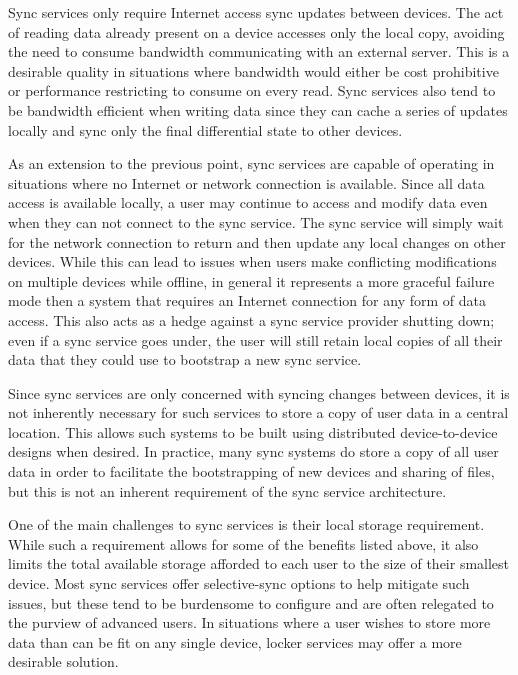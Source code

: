 \begin{packed_desc}
\item[Bandwidth Efficient:] Sync services only require Internet access
  sync updates between devices. The act of reading data already
  present on a device accesses only the local copy, avoiding the need
  to consume bandwidth communicating with an external server. This is
  a desirable quality in situations where bandwidth would either be
  cost prohibitive or performance restricting to consume on every
  read. Sync services also tend to be bandwidth efficient when writing
  data since they can cache a series of updates locally and sync only
  the final differential state to other devices.
\item[Offline Support:] As an extension to the previous point, sync
  services are capable of operating in situations where no Internet or
  network connection is available. Since all data access is available
  locally, a user may continue to access and modify data even when
  they can not connect to the sync service. The sync service will
  simply wait for the network connection to return and then update any
  local changes on other devices. While this can lead to issues when
  users make conflicting modifications on multiple devices while
  offline, in general it represents a more graceful failure mode then
  a system that requires an Internet connection for any form of data
  access. This also acts as a hedge against a sync service provider
  shutting down; even if a sync service goes under, the user will
  still retain local copies of all their data that they could use to
  bootstrap a new sync service.
\item[No Central Storage:] Since sync services are only concerned with
  syncing changes between devices, it is not inherently necessary for
  such services to store a copy of user data in a central
  location. This allows such systems to be built using distributed
  device-to-device designs when desired. In practice, many sync
  systems do store a copy of all user data in order to facilitate the
  bootstrapping of new devices and sharing of files, but this is not
  an inherent requirement of the sync service architecture.
\end{packed_desc}

One of the main challenges to sync services is their local storage
requirement. While such a requirement allows for some of the benefits
listed above, it also limits the total available storage afforded to
each user to the size of their smallest device. Most sync services
offer selective-sync options to help mitigate such issues, but these
tend to be burdensome to configure and are often relegated to the
purview of advanced users. In situations where a user wishes to store
more data than can be fit on any single device, locker services may
offer a more desirable solution.


